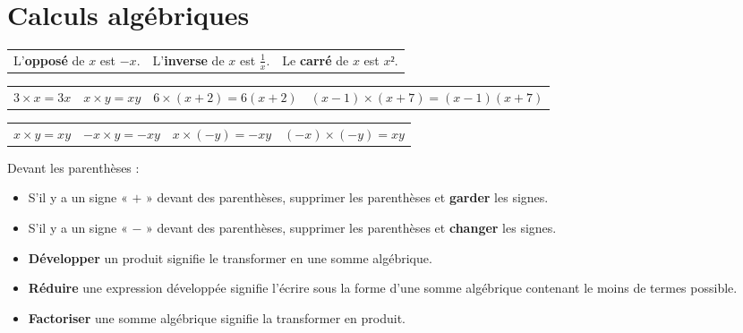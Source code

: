 \documentclass[
	10pt,
	classe=$2^{de}$,
]{coursclass}
\begin{document}
\pagebreak
\section{Calculs algébriques}

\begin{vocabulaire}
	\begin{tabularx}{\linewidth}{XXX}
		L'\textbf{opposé} de $x$ est $-x$. & L'\textbf{inverse} de $x$ est $\frac{1}{x}$. & Le \textbf{carré} de $x$ est $x²$.
	\end{tabularx}
\end{vocabulaire}

\begin{greybox}[frametitle={Notation}]
	\newcommand{\localSpacing}{1.8em}
	\begin{tabular}{llll}
		$3 × x = 3x$ \hspace{\localSpacing} & $x × y = xy$ \hspace{\localSpacing} & $6 × (x + 2) = 6(x + 2)$ \hspace{\localSpacing} & $(x - 1) × (x + 7) = (x - 1)(x + 7)$
	\end{tabular}
\end{greybox}

\begin{greybox}[frametitle={Règle des signes}]
	\begin{tabularx}{\linewidth}{XXXX}
		$x × y = xy$ & $- x × y = -xy$ & $x × (-y) = -xy$ & $(-x) × (-y) = xy$
	\end{tabularx}
	\vspace{1em}

	Devant les parenthèses :
	\begin{itemize}
		\item S’il y a un signe « $+$ » devant des parenthèses, supprimer les parenthèses et \textbf{garder} les signes.
		\item S’il y a un signe « $-$ » devant des parenthèses, supprimer les parenthèses et \textbf{changer} les signes.
	\end{itemize}
\end{greybox}

\begin{definition}[]
	\begin{itemize}
		\item \textbf{Développer} un produit signifie le transformer en une somme algébrique.
		\item \textbf{Réduire} une expression développée signifie l’écrire sous la forme d’une somme algébrique contenant le moins de termes possible.
		\item \textbf{Factoriser} une somme algébrique signifie la transformer en produit.
	\end{itemize}
\end{definition}
\end{document}
